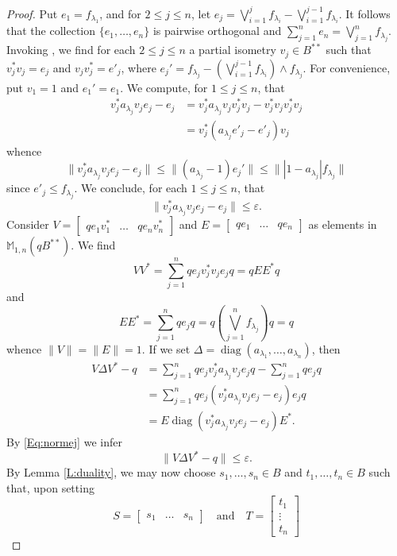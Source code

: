 \documentclass[10pt]{amsart}
\newcommand{\bM}{{\mathbb{M}}}
\newcommand{\eps}{\varepsilon}
\newcommand{\qand}{\quad\text{and}\quad}
\newcommand{\diag}{\operatorname{diag}}
\theoremstyle{definition}
\begin{document}
\begin{proof}
 Put $e_1=f_{\lambda_1}$, and for $2\leq j\leq n$, let $e_j=\bigvee_{i=1}^j f_{\lambda_i}-\bigvee_{i=1}^{j-1} f_{\lambda_i}$.  It follows that the collection $\{e_1,\ldots,e_n\}$ is pairwise orthogonal and $\sum_{j=1}^n e_n =\bigvee_{j=1}^n f_{\lambda_j}$.
 Invoking \cite[Proposition V.1.6]{takesaki2002}, we find for each $2\leq j\leq n$ a partial isometry $v_j\in B^{**}$ such that $v_j^*v_j=e_j$ and $v_jv_j^*=e'_j$, where  
 $
  e_j'=f_{\lambda_j}-\left(\bigvee_{i=1}^{j-1}f_{\lambda_i} \right)\wedge f_{\lambda_j}.
 $
 For convenience, put $v_1=1$ and $e_1'=e_1$.
 We compute, for $1\leq j\leq n$, that
 \begin{align*}
 v_j^* a_{\lambda_j}v_j e_j -e_j&=v_j^* a_{\lambda_j}v_j v_j^*v_j -v_j^*v_jv_j^*v_j\\
  &=v_j^*(a_{\lambda_j}e'_j-e'_j)v_j
 \end{align*}
 whence
\[
  \|v_j^* a_{\lambda_j}v_j e_j -e_j\|\leq \|(a_{\lambda_j}-1)e_j'\|\leq \| |1-a_{\lambda_j}|f_{\lambda_j}\|
 \]
 since $e'_j\leq f_{\lambda_j}$.
 We conclude, for each $1\leq j\leq n$, that
 \begin{equation}\label{Eq:normej}
  \|v_j^* a_{\lambda_j}v_j e_j -e_j\|\leq \eps.
 \end{equation}
 Consider $V=\begin{bmatrix}qe_1v_1^* & \ldots & qe_n v_n^*\end{bmatrix}$ and $E=\begin{bmatrix} q e_1 & \ldots & qe_n \end{bmatrix}$ as elements in $\bM_{1,n}(qB^{**})$. We find 
 \[
 VV^*=\sum_{j=1}^n qe_j v_j^*v_j e_j q=qEE^*q
 \]
 and
 \[
 EE^*=\sum_{j=1}^n q e_j q=q \left(\bigvee_{j=1}^n f_{\lambda_j}\right)q=q
 \]
 whence $\|V\|=\|E\|=1$.
 If we set $\Delta=\diag(a_{\lambda_1},\ldots,a_{\lambda_n})$, then
 \begin{align*}
 V\Delta V^*-q&=\sum_{j=1}^n qe_j v_j^* a_{\lambda_j} v_j e_j q-\sum_{j=1}^n q e_j q\\
  &=\sum_{j=1}^n qe_j (v_j^* a_{\lambda_j} v_je_j-e_j) e_j q\\
  &=E\diag(v_j^*a_{\lambda_j}v_j e_j-e_j)E^*.
 \end{align*}
 By \eqref{Eq:normej} we infer
 \begin{equation}\label{Eq:rhoDelta}
 \|V\Delta V^*-q \|\leq \eps.
 \end{equation}
 By Lemma \ref{L:duality}, we  may now  choose $s_1,\ldots,s_n\in B$ and $t_1,\ldots,t_n\in B$ such that, upon setting 
 \[
  S=\begin{bmatrix}s_1& \ldots &s_n \end{bmatrix} \qand T=\begin{bmatrix}t_1\\ \vdots \\t_n \end{bmatrix} 
\]
\end{proof}
\end{document}
